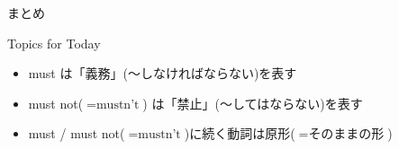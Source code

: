\documentclass[aspectratio=169,xcolor={dvipsnames,table}]{beamer}
\begin{document}
\begin{frame}[plain]{まとめ}
 \Large

\begin{exampleblock}{Topics for Today}
\small
\begin{itemize}[square]
 \item<2->  must は「義務」(〜しなければならない)を表す
 \item<3->  must not($=\text{mustn't}$) は「禁止」(〜してはならない)を表す
 \item<4->  must / must not($=\text{mustn't}$)に続く動詞は原形($=\text{そのままの形}$)
\end{itemize}

\end{exampleblock}

\vfill


\end{frame}
\end{document}
